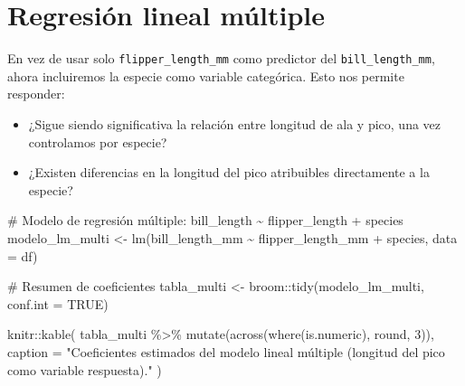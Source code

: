 \documentclass[
  spanish,
  11pt,
  a4paper,
  DIV=11,
  numbers=noendperiod]{scrartcl}
\newenvironment{Shaded}{\begin{snugshade}}{\end{snugshade}}
\newcommand{\AttributeTok}[1]{\textcolor[rgb]{0.40,0.45,0.13}{#1}}
\newcommand{\CommentTok}[1]{\textcolor[rgb]{0.37,0.37,0.37}{#1}}
\newcommand{\ConstantTok}[1]{\textcolor[rgb]{0.56,0.35,0.01}{#1}}
\newcommand{\DecValTok}[1]{\textcolor[rgb]{0.68,0.00,0.00}{#1}}
\newcommand{\FunctionTok}[1]{\textcolor[rgb]{0.28,0.35,0.67}{#1}}
\newcommand{\NormalTok}[1]{\textcolor[rgb]{0.00,0.23,0.31}{#1}}
\newcommand{\OtherTok}[1]{\textcolor[rgb]{0.00,0.23,0.31}{#1}}
\newcommand{\SpecialCharTok}[1]{\textcolor[rgb]{0.37,0.37,0.37}{#1}}
\newcommand{\StringTok}[1]{\textcolor[rgb]{0.13,0.47,0.30}{#1}}
\begin{document}
\section{Regresión lineal
múltiple}\label{regresiuxf3n-lineal-muxfaltiple}

En vez de usar solo \texttt{flipper\_length\_mm} como predictor del
\texttt{bill\_length\_mm}, ahora incluiremos la especie como variable
categórica. Esto nos permite responder:

\begin{itemize}
\item
  ¿Sigue siendo significativa la relación entre longitud de ala y pico,
  una vez controlamos por especie?
\item
  ¿Existen diferencias en la longitud del pico atribuibles directamente
  a la especie?
\end{itemize}

\begin{Shaded}
\begin{Highlighting}[numbers=left,,]
\CommentTok{\# Modelo de regresión múltiple: bill\_length \textasciitilde{} flipper\_length + species}
\NormalTok{modelo\_lm\_multi }\OtherTok{\textless{}{-}} \FunctionTok{lm}\NormalTok{(bill\_length\_mm }\SpecialCharTok{\textasciitilde{}}\NormalTok{ flipper\_length\_mm }\SpecialCharTok{+}\NormalTok{ species, }\AttributeTok{data =}\NormalTok{ df)}

\CommentTok{\# Resumen de coeficientes}
\NormalTok{tabla\_multi }\OtherTok{\textless{}{-}}\NormalTok{ broom}\SpecialCharTok{::}\FunctionTok{tidy}\NormalTok{(modelo\_lm\_multi, }\AttributeTok{conf.int =} \ConstantTok{TRUE}\NormalTok{)}

\NormalTok{knitr}\SpecialCharTok{::}\FunctionTok{kable}\NormalTok{(}
\NormalTok{  tabla\_multi }\SpecialCharTok{\%\textgreater{}\%}
    \FunctionTok{mutate}\NormalTok{(}\FunctionTok{across}\NormalTok{(}\FunctionTok{where}\NormalTok{(is.numeric), round, }\DecValTok{3}\NormalTok{)),}
  \AttributeTok{caption =} \StringTok{"Coeficientes estimados del modelo lineal múltiple }
\StringTok{  (longitud del pico como variable respuesta)."}
\NormalTok{)}
\end{Highlighting}
\end{Shaded}
\end{document}
